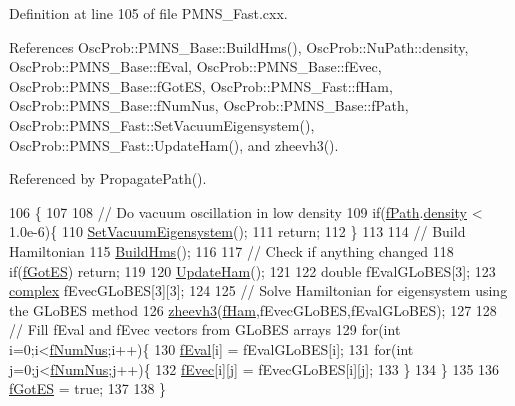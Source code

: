 Definition at line 105 of file P\+M\+N\+S\+\_\+\+Fast.\+cxx.



References Osc\+Prob\+::\+P\+M\+N\+S\+\_\+\+Base\+::\+Build\+Hms(), Osc\+Prob\+::\+Nu\+Path\+::density, Osc\+Prob\+::\+P\+M\+N\+S\+\_\+\+Base\+::f\+Eval, Osc\+Prob\+::\+P\+M\+N\+S\+\_\+\+Base\+::f\+Evec, Osc\+Prob\+::\+P\+M\+N\+S\+\_\+\+Base\+::f\+Got\+ES, Osc\+Prob\+::\+P\+M\+N\+S\+\_\+\+Fast\+::f\+Ham, Osc\+Prob\+::\+P\+M\+N\+S\+\_\+\+Base\+::f\+Num\+Nus, Osc\+Prob\+::\+P\+M\+N\+S\+\_\+\+Base\+::f\+Path, Osc\+Prob\+::\+P\+M\+N\+S\+\_\+\+Fast\+::\+Set\+Vacuum\+Eigensystem(), Osc\+Prob\+::\+P\+M\+N\+S\+\_\+\+Fast\+::\+Update\+Ham(), and zheevh3().



Referenced by Propagate\+Path().


\begin{DoxyCode}
106 \{
107 
108   \textcolor{comment}{// Do vacuum oscillation in low density}
109   \textcolor{keywordflow}{if}(\hyperlink{classOscProb_1_1PMNS__Base_a849437aa8891fe042e86886ce8f81c6e}{fPath}.\hyperlink{structOscProb_1_1NuPath_a54ddd451db69bc54434de3cf18a117ca}{density} < 1.0e-6)\{
110     \hyperlink{classOscProb_1_1PMNS__Fast_a76dd5a761df8689c502b28ad0391f9e2}{SetVacuumEigensystem}();
111     \textcolor{keywordflow}{return};
112   \}
113 
114   \textcolor{comment}{// Build Hamiltonian}
115   \hyperlink{classOscProb_1_1PMNS__Base_ad0faf5eae755afb1baa1fcd5ffebad41}{BuildHms}();
116 
117   \textcolor{comment}{// Check if anything changed  }
118   \textcolor{keywordflow}{if}(\hyperlink{classOscProb_1_1PMNS__Base_a6dc5cd010d2d70b2324745b4e53e9839}{fGotES}) \textcolor{keywordflow}{return};
119 
120   \hyperlink{classOscProb_1_1PMNS__Fast_a16248082308f9d2c332ebf1be0aa90c3}{UpdateHam}();
121 
122   \textcolor{keywordtype}{double} fEvalGLoBES[3];
123   \hyperlink{classOscProb_1_1PMNS__Base_ae86ec4718808ce9d02e5f5b4226714ab}{complex} fEvecGLoBES[3][3];
124 
125   \textcolor{comment}{// Solve Hamiltonian for eigensystem using the GLoBES method}
126   \hyperlink{zheevh3_8cxx_a96ac4b39a8406951c69eeabad77a3bc6}{zheevh3}(\hyperlink{classOscProb_1_1PMNS__Fast_aab37f2a7f59ab7026a8a21a561115dd0}{fHam},fEvecGLoBES,fEvalGLoBES);
127 
128   \textcolor{comment}{// Fill fEval and fEvec vectors from GLoBES arrays  }
129   \textcolor{keywordflow}{for}(\textcolor{keywordtype}{int} i=0;i<\hyperlink{classOscProb_1_1PMNS__Base_a24bb74bed63569dfe88b18fa6a08060e}{fNumNus};i++)\{
130     \hyperlink{classOscProb_1_1PMNS__Base_a6319c34d7decbb9d7d6da279c06e8c2d}{fEval}[i] = fEvalGLoBES[i];
131     \textcolor{keywordflow}{for}(\textcolor{keywordtype}{int} j=0;j<\hyperlink{classOscProb_1_1PMNS__Base_a24bb74bed63569dfe88b18fa6a08060e}{fNumNus};j++)\{
132       \hyperlink{classOscProb_1_1PMNS__Base_a093e7bd31d4ef52ed52df414e12c1d17}{fEvec}[i][j] = fEvecGLoBES[i][j];
133     \}
134   \}
135   
136   \hyperlink{classOscProb_1_1PMNS__Base_a6dc5cd010d2d70b2324745b4e53e9839}{fGotES} = \textcolor{keyword}{true};
137 
138 \}
\end{DoxyCode}
